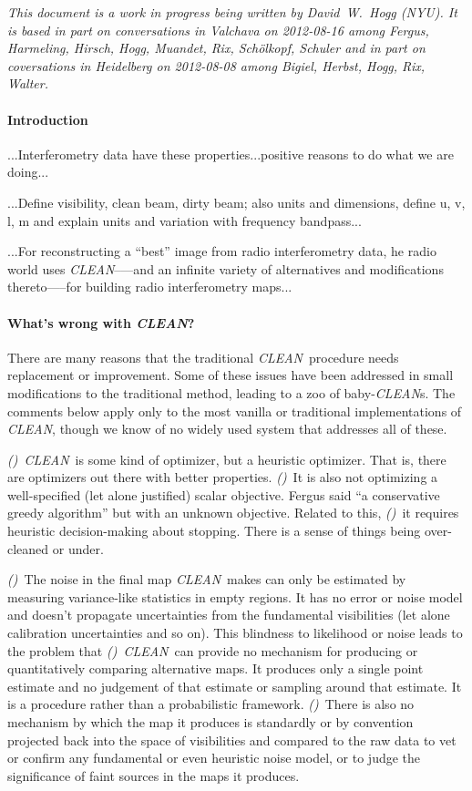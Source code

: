 \documentclass[12pt]{article}
\newcounter{hogg}
\newcommand{\hoggitem}{\textsl{(\thehogg)}\stepcounter{hogg}}
\newcommand{\project}[1]{\textsl{#1}}
\newcommand{\CLEAN}{\project{CLEAN}}
\begin{document}
\sloppy\sloppypar

\textsl{This document is a work in progress being written by
  David~W.~Hogg (NYU).  It is based in part on conversations in
  Valchava on 2012-08-16 among Fergus, Harmeling, Hirsch, Hogg,
  Muandet, Rix, Sch\"olkopf, Schuler and in part on coversations in
  Heidelberg on 2012-08-08 among Bigiel, Herbst, Hogg, Rix, Walter.}

\paragraph{Introduction}

...Interferometry data have these properties...positive reasons to do
what we are doing...

...Define visibility, clean beam, dirty beam; also units and
dimensions, define u, v, l, m and explain units and variation with
frequency bandpass...

...For reconstructing a ``best'' image from radio interferometry data,
he radio world uses \CLEAN--—and an infinite variety of alternatives
and modifications thereto—--for building radio interferometry maps...

\paragraph{What's wrong with \CLEAN?}

There are many reasons that the traditional \CLEAN\ procedure needs
replacement or improvement.  Some of these issues have been addressed
in small modifications to the traditional method, leading to a zoo of
baby-\CLEAN s.  The comments below apply only to the most vanilla or
traditional implementations of \CLEAN, though we know of no widely
used system that addresses all of these.

\hoggitem~\CLEAN\ is some kind of optimizer, but a heuristic
optimizer.  That is, there are optimizers out there with better
properties.  \hoggitem~It is also not optimizing a well-specified (let
alone justified) scalar objective.  Fergus said ``a conservative
greedy algorithm'' but with an unknown objective.  Related to this,
\hoggitem~it requires heuristic decision-making about stopping.  There
is a sense of things being over-cleaned or under.

\hoggitem~The noise in the final map \CLEAN\ makes can only be
estimated by measuring variance-like statistics in empty regions.  It
has no error or noise model and doesn't propagate uncertainties from
the fundamental visibilities (let alone calibration uncertainties and
so on).  This blindness to likelihood or noise leads to the problem
that \hoggitem~\CLEAN\ can provide no mechanism for producing or
quantitatively comparing alternative maps.  It produces only a single
point estimate and no judgement of that estimate or sampling around
that estimate.  It is a procedure rather than a probabilistic
framework.  \hoggitem~There is also no mechanism by which the map it
produces is standardly or by convention projected back into the space
of visibilities and compared to the raw data to vet or confirm any
fundamental or even heuristic noise model, or to judge the
significance of faint sources in the maps it produces.
\end{document}
